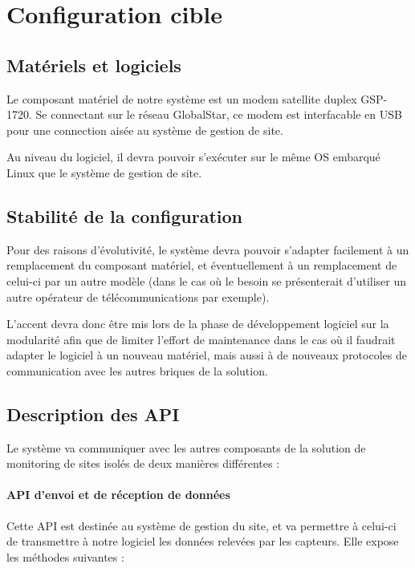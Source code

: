 \section{Configuration cible}

\subsection{Matériels et logiciels}

Le composant matériel de notre système est un modem satellite duplex GSP-1720. Se connectant sur le réseau GlobalStar, ce modem est interfacable en USB pour une connection aisée au système de gestion de site.

Au niveau du logiciel, il devra pouvoir s'exécuter sur le même OS embarqué Linux que le système de gestion de site.

\subsection{Stabilité de la configuration}

Pour des raisons d'évolutivité, le système devra pouvoir s'adapter facilement à un remplacement du composant matériel, et éventuellement à un remplacement de celui-ci par un autre modèle (dans le cas où le besoin se présenterait d'utiliser un autre opérateur de télécommunications par exemple).

L'accent devra donc être mis lors de la phase de développement logiciel sur la modularité afin que de limiter l'effort de maintenance dans le cas où il faudrait adapter le logiciel à un nouveau matériel, mais aussi à de nouveaux protocoles de communication avec les autres briques de la solution.

\subsection{Description des API}

Le système va communiquer avec les autres composants de la solution de monitoring de sites isolés de deux manières différentes :

\paragraph{API d'envoi et de réception de données}

Cette API est destinée au système de gestion du site, et va permettre à celui-ci de transmettre à notre logiciel les données relevées par les capteurs. Elle expose les méthodes suivantes :


